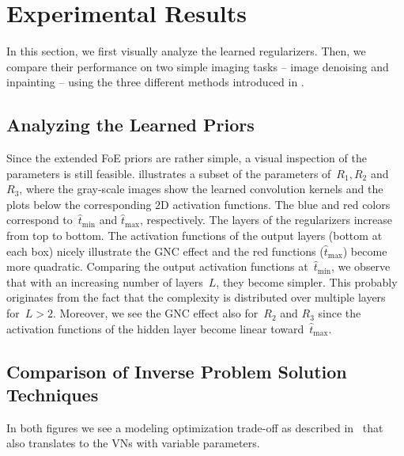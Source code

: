 \documentclass{article}
\def\hatt{{\widehat{t}}}
\newcommand{\tminh}{\hatt_\mathrm{min}}
\newcommand{\tmaxh}{\hatt_\mathrm{max}}
\theoremstyle{plain}
\theoremstyle{definition}
\theoremstyle{remark}
\begin{document}
\section{Experimental Results}
In this section, we first visually analyze the learned regularizers.
Then, we compare their performance on two simple imaging tasks -- image denoising and inpainting -- using the three different methods introduced in .

\subsection{Analyzing the Learned Priors}
Since the extended FoE priors are rather simple, a visual inspection of the parameters is still feasible.
 illustrates a subset of the parameters of~$R_1,R_2$ and $R_3$, where the gray-scale images show the learned convolution kernels and the plots below the corresponding 2D activation functions.
The blue and red colors correspond to~$\tminh$ and $\tmaxh$, respectively.
The layers of the regularizers increase from top to bottom.
The activation functions of the output layers (bottom at each box) nicely illustrate the GNC effect and the red functions ($\tmaxh$) become more quadratic.
Comparing the output activation functions at~$\tminh$, we observe that with an increasing number of layers~$L$, they become simpler.
This probably originates from the fact that the complexity is distributed over multiple layers for~$L>2$.
Moreover, we see the GNC effect also for~$R_2$ and $R_3$ since the activation functions of the hidden layer become linear toward~$\tmaxh$.

\subsection{Comparison of Inverse Problem Solution Techniques}
In both figures we see a modeling optimization trade-off as described in~\cite{EfKo20} that also translates to the VNs with variable parameters.
\end{document}
